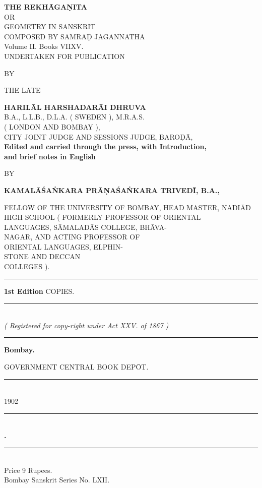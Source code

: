 \documentclass[11pt, openany]{book}
\begin{document}
\thispagestyle{empty}
\begin{center}
{\en \textbf{\Huge THE REKHĀGAṆITA }\\
{\small OR} \\
{\large GEOMETRY IN SANSKRIT }\\
{\large COMPOSED BY SAMRĀḌ JAGANNĀTHA }\\
{\LARGE Volume II. Books VII\textendash XV. }\\
 UNDERTAKEN FOR PUBLICATION     
 \vspace{1mm}
 
{\small BY} 
\vspace{1mm}

THE LATE 
\vspace{1mm}

\textbf{\LARGE HARILĀL HARSHADARĀI DHRUVA }\\
{\small B.A., L.L.B., D.L.A. ( SWEDEN ), M.R.A.S. \\
( LONDON AND BOMBAY ), \\
CITY JOINT JUDGE AND SESSIONS JUDGE, BAROḌĀ,} \\
\textbf{Edited and carried through the press, with Introduction, \\
and brief notes in English} 
\vspace{1mm}

{\small BY} 
\vspace{1mm}

\textbf{\large KAMALĀŚAṄKARA PRĀṆAŚAṄKARA TRIVEDĪ, B.A.,}
\vspace{1mm}

{\small FELLOW OF THE UNIVERSITY OF BOMBAY, HEAD MASTER, NADIĀD\\
HIGH SCHOOL ( FORMERLY PROFESSOR OF ORIENTAL \\
LANGUAGES, SĀMALADĀS COLLEGE, BHĀVA- \\
NAGAR, AND ACTING PROFESSOR OF \\
ORIENTAL LANGUAGES, ELPHIN- \\
STONE AND DECCAN\\
COLLEGES ). }\\
\rule{1.5in}{0.3pt}
\vspace{1mm}

\textbf{\large 1st Edition} COPIES. \\
\rule{1.5in}{0.3pt}\\

\emph{\en ( Registered for copy-right under Act XXV. of 1867 )}\\ 
\rule{1in}{1pt}
\vspace{3mm}

\textbf{{\large Bombay.}}
\vspace{1mm}

{\large GOVERNMENT CENTRAL BOOK DEPŌT.} \\
\rule{0.5in}{0.3pt}\\
1902 \\
\rule{0.5in}{0.3pt}\\
{\large {\bf {}.}} \\
\rule{0.5in}{0.3pt}\\
Price 9 Rupees.\\
{\large Bombay Sanskrit Series No. LXII.}}
\end{center}
\end{document}
